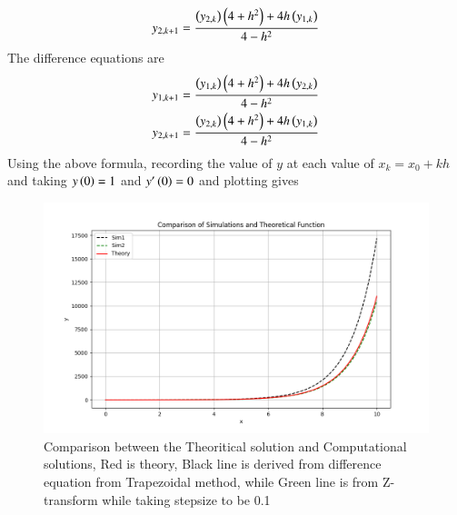 \documentclass[journal]{IEEEtran}
\begin{document}
\begin{align}
y_{2,k+1} = \frac{\left(y_{2,k}\right)\left(4+h^2\right)+4h\left(y_{1,k}\right)}{4-h^2}
\end{align}
The difference equations are
\begin{align}
y_{1,k+1} = \frac{\left(y_{1,k}\right)\left(4+h^2\right)+4h\left(y_{2,k}\right)}{4-h^2}\\
y_{2,k+1} = \frac{\left(y_{2,k}\right)\left(4+h^2\right)+4h\left(y_{1,k}\right)}{4-h^2}
\end{align}
Using the above formula, recording the value of $y$ at each value of $x_{k} = x_0 + kh$ and taking $y\left(0\right) = 1$ and $y^\prime\left(0\right)=0$ and plotting gives
\begin{figure}[h!]
   \centering
   \includegraphics[width=\columnwidth]{figs/fig.png}
   \caption{Comparison between the Theoritical solution and Computational solutions, Red is theory, Black line is derived from difference equation from Trapezoidal method, while Green line is from Z-transform while taking stepsize to be 0.1}
   \label{stemplot}
\end{figure}
\end{document}
